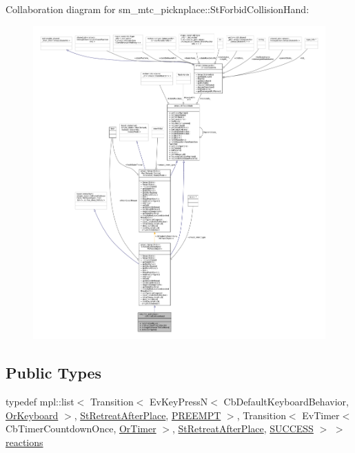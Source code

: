 Collaboration diagram for sm\+\_\+mtc\+\_\+picknplace\+:\+:St\+Forbid\+Collision\+Hand\+:
\nopagebreak
\begin{figure}[H]
\begin{center}
\leavevmode
\includegraphics[width=350pt]{structsm__mtc__picknplace_1_1StForbidCollisionHand__coll__graph}
\end{center}
\end{figure}
\subsection*{Public Types}
\begin{DoxyCompactItemize}
\item 
typedef mpl\+::list$<$ Transition$<$ Ev\+Key\+PressN$<$ Cb\+Default\+Keyboard\+Behavior, \hyperlink{classsm__mtc__picknplace_1_1OrKeyboard}{Or\+Keyboard} $>$, \hyperlink{structsm__mtc__picknplace_1_1StRetreatAfterPlace}{St\+Retreat\+After\+Place}, \hyperlink{classPREEMPT}{P\+R\+E\+E\+M\+PT} $>$, Transition$<$ Ev\+Timer$<$ Cb\+Timer\+Countdown\+Once, \hyperlink{classsm__mtc__picknplace_1_1OrTimer}{Or\+Timer} $>$, \hyperlink{structsm__mtc__picknplace_1_1StRetreatAfterPlace}{St\+Retreat\+After\+Place}, \hyperlink{classSUCCESS}{S\+U\+C\+C\+E\+SS} $>$ $>$ \hyperlink{structsm__mtc__picknplace_1_1StForbidCollisionHand_a0ee89b89ef23b544ab9e04f477d768be}{reactions}
\end{DoxyCompactItemize}
